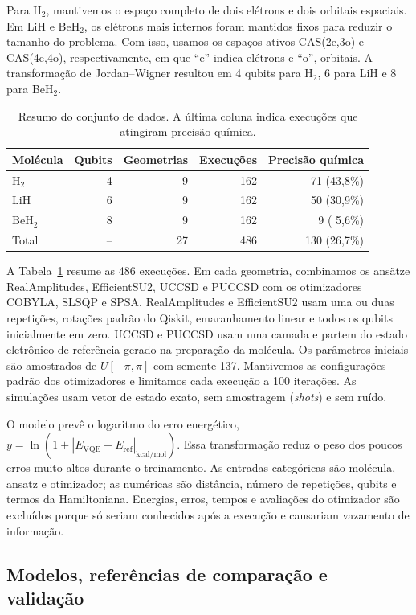 Para H$_2$, mantivemos o espaço completo de dois elétrons e dois orbitais
espaciais. Em LiH e BeH$_2$, os elétrons mais internos foram mantidos fixos para
reduzir o tamanho do problema. Com isso, usamos os espaços ativos CAS(2e,3o) e
CAS(4e,4o), respectivamente, em que ``e'' indica elétrons e ``o'', orbitais. A
transformação de Jordan--Wigner resultou em 4 qubits para H$_2$, 6 para LiH e 8
para BeH$_2$.

\begin{table}[ht]
\centering
\caption{Resumo do conjunto de dados. A última coluna indica execuções que
atingiram precisão química.}
\label{tab:dataset}
\begin{tabular}{lrrrr}
\toprule
Molécula & Qubits & Geometrias & Execuções & Precisão química \\
\midrule
H$_2$   & 4 & 9 & 162 & 71 (43,8\%) \\
LiH     & 6 & 9 & 162 & 50 (30,9\%) \\
BeH$_2$ & 8 & 9 & 162 &  9 ( 5,6\%) \\
\midrule
Total   & -- & 27 & 486 & 130 (26,7\%) \\
\bottomrule
\end{tabular}
\end{table}

A Tabela~\ref{tab:dataset} resume as 486 execuções. Em cada geometria, combinamos
os ansätze RealAmplitudes, EfficientSU2, UCCSD e PUCCSD com os otimizadores
COBYLA, SLSQP e SPSA. RealAmplitudes e EfficientSU2 usam uma ou duas repetições,
rotações padrão do Qiskit, emaranhamento linear e todos os qubits inicialmente
em zero. UCCSD e PUCCSD usam uma camada e partem do estado eletrônico de
referência gerado na preparação da molécula. Os parâmetros iniciais são
amostrados de $U[-\pi,\pi]$ com semente 137. Mantivemos as configurações padrão
dos otimizadores e limitamos cada execução a 100 iterações. As simulações usam
vetor de estado exato, sem amostragem (\textit{shots}) e sem ruído.

O modelo prevê o logaritmo do erro energético,
$y=\ln(1+|E_{\mathrm{VQE}}-E_{\mathrm{ref}}|_{\mathrm{kcal/mol}})$. Essa
transformação reduz o peso dos poucos erros muito altos durante o treinamento.
As entradas categóricas são molécula, ansatz e otimizador; as numéricas são
distância, número de repetições, qubits e termos da Hamiltoniana. Energias,
erros, tempos e avaliações do otimizador são excluídos porque só seriam
conhecidos após a execução e causariam vazamento de informação.

\subsection{Modelos, referências de comparação e validação}


